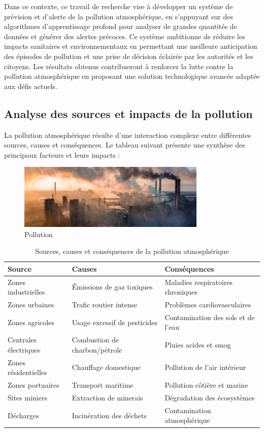 \documentclass[12pt,a4paper]{report}
\begin{document}
Dans ce contexte, ce travail de recherche vise à développer un système de prévision et d’alerte de la pollution atmosphérique, en s’appuyant sur des algorithmes d’apprentissage profond pour analyser de grandes quantités de données et générer des alertes précoces. Ce système ambitionne de réduire les impacts sanitaires et environnementaux en permettant une meilleure anticipation des épisodes de pollution et une prise de décision éclairée par les autorités et les citoyens. Les résultats obtenus contribueront à renforcer la lutte contre la pollution atmosphérique en proposant une solution technologique avancée adaptée aux défis actuels.
\subsection{Analyse des sources et impacts de la pollution}
La pollution atmosphérique résulte d'une interaction complexe entre différentes sources, causes et conséquences. Le tableau suivant présente une synthèse des principaux facteurs et leurs impacts :
\begin{figure}[h]
    \centering
    \includegraphics[width=0.8\textwidth]{pollution.png}
    \caption{Pollution}
    \label{fig:Pollution}
\end{figure}

\begin{table}[h]
    \centering
    \begin{tabular}{|p{5cm}|p{5cm}|p{5cm}|}
    \hline
    \textbf{Source} & \textbf{Causes} & \textbf{Conséquences} \\
    \hline
    Zones industrielles & Émissions de gaz toxiques & Maladies respiratoires chroniques \\
    \hline
    Zones urbaines & Trafic routier intense & Problèmes cardiovasculaires \\
    \hline
    Zones agricoles & Usage excessif de pesticides & Contamination des sols et de l'eau \\
    \hline
    Centrales électriques & Combustion de charbon/pétrole & Pluies acides et smog \\
    \hline
    Zones résidentielles & Chauffage domestique & Pollution de l'air intérieur \\
    \hline
    Zones portuaires & Transport maritime & Pollution côtière et marine \\
    \hline
    Sites miniers & Extraction de minerais & Dégradation des écosystèmes \\
    \hline
    Décharges & Incinération des déchets & Contamination atmosphérique \\
    \hline
    \end{tabular}
    \caption{Sources, causes et conséquences de la pollution atmosphérique}
    \label{tab:pollution}
    \end{table}
\end{document}
